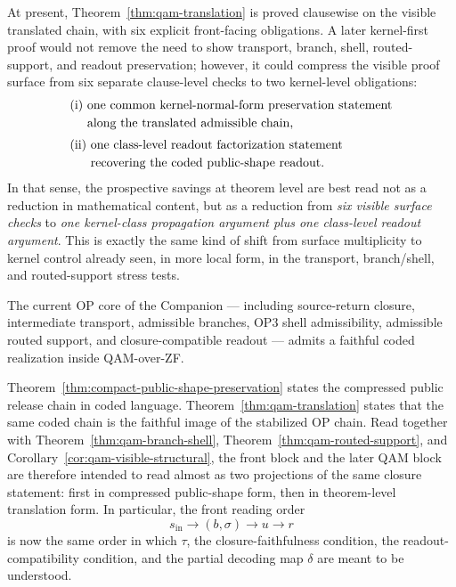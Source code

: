 \begin{remark}\label{rem:qam-zero-kernel-translation-savings}
At present, Theorem~\ref{thm:qam-translation} is proved clausewise on the visible translated chain, with six explicit front-facing obligations. A later kernel-first proof would not remove the need to show transport, branch, shell, routed-support, and readout preservation; however, it could compress the visible proof surface from six separate clause-level checks to two kernel-level obligations:
\[
\begin{aligned}
&\text{(i) one common kernel-normal-form preservation statement}\\[-0.05em]
&\text{\phantom{(i)} along the translated admissible chain,}\\[0.25em]
&\text{(ii) one class-level readout factorization statement}\\[-0.05em]
&\text{\phantom{(ii)} recovering the coded public-shape readout.}
\end{aligned}
\]
In that sense, the prospective savings at theorem level are best read not as a reduction in mathematical content, but as a reduction from \emph{six visible surface checks} to \emph{one kernel-class propagation argument plus one class-level readout argument}. This is exactly the same kind of shift from surface multiplicity to kernel control already seen, in more local form, in the transport, branch/shell, and routed-support stress tests.
\end{remark}

\begin{corollary}
The current OP core of the Companion --- including source-return closure, intermediate transport, admissible branches, OP3 shell admissibility, admissible routed support, and closure-compatible readout --- admits a faithful coded realization inside QAM-over-ZF.
\end{corollary}

\begin{remark}
Theorem~\ref{thm:compact-public-shape-preservation} states the compressed public release chain in coded language. Theorem~\ref{thm:qam-translation} states that the same coded chain is the faithful image of the stabilized OP chain. Read together with Theorem~\ref{thm:qam-branch-shell}, Theorem~\ref{thm:qam-routed-support}, and Corollary~\ref{cor:qam-visible-structural}, the front block and the later QAM block are therefore intended to read almost as two projections of the same closure statement: first in compressed public-shape form, then in theorem-level translation form. In particular, the front reading order
\[
s_{\mathrm{in}}\longrightarrow (b,\sigma)\longrightarrow u\longrightarrow r
\]
is now the same order in which $\tau$, the closure-faithfulness condition, the readout-compatibility condition, and the partial decoding map $\delta$ are meant to be understood.
\end{remark}


